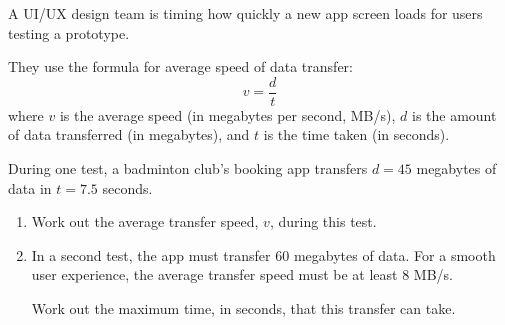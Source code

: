 \begin{question}
\noindent A UI/UX design team is timing how quickly a new app screen loads for users testing a prototype.

They use the formula for average speed of data transfer:
\[
v = \frac{d}{t}
\]
where $v$ is the average speed (in megabytes per second, MB/s), $d$ is the amount of data transferred (in megabytes), and $t$ is the time taken (in seconds).

During one test, a badminton club's booking app transfers $d = 45$ megabytes of data in $t = 7.5$ seconds.

\begin{enumerate}
    \item[(a)] Work out the average transfer speed, $v$, during this test.
    \vspace{3cm}

    \item[(b)] In a second test, the app must transfer 60 megabytes of data. For a smooth user experience, the average transfer speed must be at least 8 MB/s.

    Work out the maximum time, in seconds, that this transfer can take.
    \vspace{3.5cm}
\end{enumerate}
\end{question}
